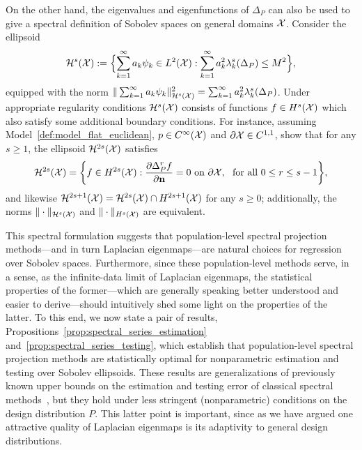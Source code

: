 On the other hand, the eigenvalues and eigenfunctions of $\Delta_P$ can also be used to give a spectral definition of Sobolev spaces on general domains $\mathcal{X}$. Consider the ellipsoid
\begin{equation}
\label{eqn:sobolev_ellipsoid}
\mathcal{H}^{s}(\mathcal{X}) := \Bigl\{\sum_{k = 1}^{\infty} a_k \psi_k \in L^2(\mathcal{X}):  \sum_{k = 1}^{\infty} a_k^2 \lambda_{k}^s(\Delta_P) \leq M^2 \Bigr\},
\end{equation}
equipped with the norm $\|\sum_{k = 1}^{\infty} a_k \psi_k\|_{\mathcal{H}^s(\mathcal{X})}^2 = \sum_{k = 1}^{\infty} a_k^2 \lambda_{k}^s(\Delta_P)$. Under appropriate regularity conditions $\mathcal{H}^s(\mathcal{X})$ consists of functions $f \in H^s(\mathcal{X})$ which also satisfy some additional boundary conditions. For instance, assuming Model~\ref{def:model_flat_euclidean}, $p \in C^{\infty}(\mathcal{X})$ and $\partial \mathcal{X} \in C^{1,1}$, \citet{dunlop2020} show that for any $s \geq 1$, the ellipsoid $\mathcal{H}^{2s}(\mathcal{X})$ satisfies
\begin{equation}
\label{eqn:sobolev_ellipsoid_to_sobolev_ball}
\mathcal{H}^{2s}(\mathcal{X}) = 
\biggl\{f \in H^{2s}(\mathcal{X}): \frac{\partial \Delta_P^rf}{\partial {\bf n}} = 0~\textrm{on}~\partial\mathcal{X},~~\textrm{for all $0 \leq r \leq s - 1$} \biggr\},
\end{equation}
and likewise $\mathcal{H}^{2s + 1}(\mathcal{X}) = \mathcal{H}^{2s}(\mathcal{X}) \cap H^{2s + 1}(\mathcal{X})$ for any $s \geq 0$; additionally, the norms $\|\cdot\|_{\mathcal{H}^s(\mathcal{X})}$ and $\|\cdot\|_{H^s(\mathcal{X})}$ are equivalent.

This spectral formulation suggests that population-level spectral projection methods---and in turn Laplacian eigenmaps---are natural choices for regression over Sobolev spaces. Furthermore, since these population-level methods serve, in a sense, as the infinite-data limit of Laplacian eigenmaps, the statistical properties of the former---which are generally speaking better understood and easier to derive---should intuitively shed some light on the properties of the latter. To this end, we now state a pair of results, Propositions~\ref{prop:spectral_series_estimation} and~\ref{prop:spectral_series_testing}, which establish that population-level spectral projection methods are statistically optimal for nonparametric estimation and testing over Sobolev ellipsoids. These results are generalizations of previously known upper bounds on the estimation and testing error of classical spectral methods~\citep{tsybakov08,ingster2009}, but they hold under less stringent (nonparametric) conditions on the design distribution $P$. This latter point is important, since as we have argued one attractive quality of Laplacian eigenmaps is its adaptivity to general design distributions.

